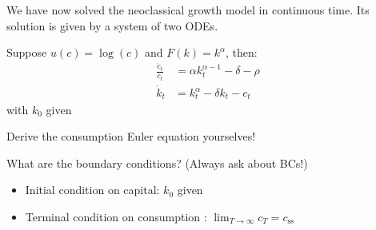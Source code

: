 \documentclass[11pt, aspectratio=169]{beamer}
\newenvironment{witemize}{\itemize\addtolength{\itemsep}{10pt}}{\enditemize}
\begin{document}
\begin{frame}{}

\begin{witemize}
\item We have now solved the neoclassical growth model in continuous time. Its solution is given by a system of two ODEs. 

\item Suppose $u(c) = \log(c)$ and $F(k) = k^\alpha$, then:
\begin{align*}
	\frac{\dot c_t}{c_t} &= \alpha k_t^{\alpha - 1} - \delta - \rho \\
	\dot k_t &= k_t^\alpha - \delta k_t - c_t
\end{align*}
with $k_0$ given

\item Derive the consumption Euler equation yourselves!

\item What are the boundary conditions? (Always ask about BCs!) 
\begin{itemize}
	\item Initial condition on capital: $k_0$ given
	\item Terminal condition on consumption : $\lim_{T \to \infty} c_T = c_\text{ss}$ 
\end{itemize}

\end{witemize}

\end{frame}
\end{document}
